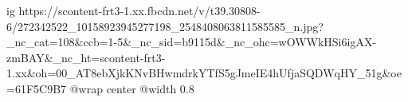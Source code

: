  
 
 
 
 

\ifcmt
  ig https://scontent-frt3-1.xx.fbcdn.net/v/t39.30808-6/272342522_10158923945277198_2548408063811585585_n.jpg?_nc_cat=108&ccb=1-5&_nc_sid=b9115d&_nc_ohc=wOWWkHSi6igAX-zmBAY&_nc_ht=scontent-frt3-1.xx&oh=00_AT8ebXjkKNvBHwmdrkYTfS5gJmeIE4hUfjaSQDWqHY_51g&oe=61F5C9B7
	@wrap center
	@width 0.8
\fi
